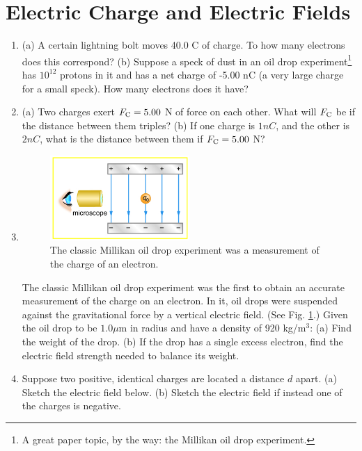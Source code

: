 \documentclass[10pt]{article}
\begin{document}
\section{Electric Charge and Electric Fields}

\begin{enumerate}
\item (a) A certain lightning bolt moves 40.0 C of charge.  To how many electrons does this correspond? (b) Suppose a speck of dust in an oil drop experiment\footnote{A great paper topic, by the way: the Millikan oil drop experiment.} has  $10^{12}$  protons in it and has a net charge of -5.00 nC (a very large charge for a small speck). How many electrons does it have?\\ \vspace{1cm}
\item (a) Two charges exert $F_{\rm C} = 5.00$ N of force on each other. What will $F_{\rm C}$ be if the distance between them triples? (b) If one charge is $1 nC$, and the other is $2 nC$, what is the distance between them if $F_{\rm C} = 5.00$ N? \\ \vspace{1cm}
\item 
\begin{figure}
\centering
\includegraphics[width=0.5\textwidth]{mill.jpeg}
\caption{\label{fig:mill} The classic Millikan oil drop experiment was a measurement of the charge of an electron.}
\end{figure}
The classic Millikan oil drop experiment was the first to obtain an accurate measurement of the charge on an electron. In it, oil drops were suspended against the gravitational force by a vertical electric field. (See Fig. \ref{fig:mill}.) Given the oil drop to be $1.0 \mu$m in radius and have a density of 920 kg/m$^3$: (a) Find the weight of the drop. (b) If the drop has a single excess electron, find the electric field strength needed to balance its weight. \\ \vspace{1.75cm}
\item Suppose two positive, identical charges are located a distance $d$ apart. (a) Sketch the electric field below.  (b) Sketch the electric field if instead one of the charges is negative. \\ \vspace{1.5cm}
\end{enumerate}
\end{document}
